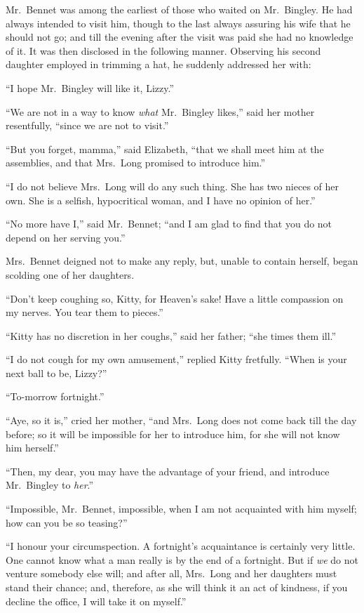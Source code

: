 \documentclass[12pt,english]{book}
\begin{document}

Mr.\ Bennet was among the earliest of those who waited on Mr.\ Bingley.
He had always intended to visit him, though to the last always assuring
his wife that he should not go; and till the evening after the visit
was paid she had no knowledge of it. It was then disclosed in the
following manner. Observing his second daughter employed in trimming
a hat, he suddenly addressed her with:

{}``I hope Mr.\ Bingley will like it, Lizzy.''

{}``We are not in a way to know \textit{what} Mr.\ Bingley likes,''
said her mother resentfully, {}``since we are not to visit.''

{}``But you forget, mamma,'' said Elizabeth, {}``that we shall
meet him at the assemblies, and that Mrs.\ Long promised to introduce
him.''

{}``I do not believe Mrs.\ Long will do any such thing. She has
two nieces of her own. She is a selfish, hypocritical woman, and I
have no opinion of her.''

{}``No more have I,'' said Mr.\ Bennet; {}``and I am glad to find
that you do not depend on her serving you.''

Mrs.\ Bennet deigned not to make any reply, but, unable to contain
herself, began scolding one of her daughters.

{}``Don't keep coughing so, Kitty, for Heaven's sake! Have a little
compassion on my nerves. You tear them to pieces.''

{}``Kitty has no discretion in her coughs,'' said her father; {}``she
times them ill.''

{}``I do not cough for my own amusement,'' replied Kitty fretfully.
{}``When is your next ball to be, Lizzy?''\ 

{}``To-morrow fortnight.''

{}``Aye, so it is,'' cried her mother, {}``and Mrs.\ Long does
not come back till the day before; so it will be impossible for her
to introduce him, for she will not know him herself.''

{}``Then, my dear, you may have the advantage of your friend, and
introduce Mr.\ Bingley to \textit{her}.''

{}``Impossible, Mr.\ Bennet, impossible, when I am not acquainted
with him myself; how can you be so teasing?''\ 

{}``I honour your circumspection. A fortnight's acquaintance is certainly
very little. One cannot know what a man really is by the end of a
fortnight. But if \textit{we} do not venture somebody else will; and
after all, Mrs.\ Long and her daughters must stand their chance;
and, therefore, as she will think it an act of kindness, if you decline
the office, I will take it on myself.''
\end{document}
